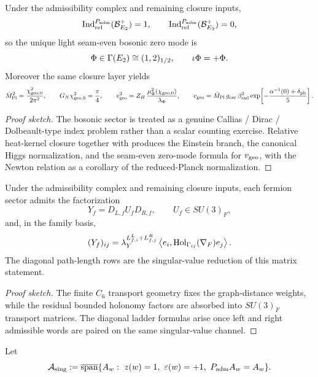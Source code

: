 \begin{theorem}
Under the admissibility complex and remaining closure inputs,
\[
\operatorname{Ind}_{\mathrm{rel}}^{P_{\mathrm{adm}}}(\mathcal B_{E_2}^+)=1,
\qquad
\operatorname{Ind}_{\mathrm{rel}}^{P_{\mathrm{adm}}}(\mathcal B_{E_3}^+)=0,
\]
so the unique light seam-even bosonic zero mode is
\[
\Phi\in\Gamma(E_2)\cong(1,2)_{1/2},
\qquad
\iota\Phi=+\Phi.
\]
Moreover the same closure layer yields
\[
\bar M_{\mathrm{Pl}}^2=\frac{\chi_{\mathrm{geo},0}^2}{2\pi^2},
\qquad
G_N\chi_{\mathrm{geo},0}^2=\frac{\pi}{4},
\qquad
v_{\mathrm{geo}}^2=Z_H\,\frac{\mu_\Phi^2(\chi_{\mathrm{geo},0})}{\lambda_\Phi},
\qquad
v_{\mathrm{geo}}=\bar M_{\mathrm{Pl}}\,g_{\mathrm{car}}\,\beta_{\mathrm{rad}}^2
\exp\!\left[-\frac{\alpha^{-1}(0)+\delta_{\mathrm{ph}}}{5}\right].
\]
\end{theorem}

\begin{proof}[Proof sketch]
The bosonic sector is treated as a genuine Callias / Dirac / Dolbeault-type index problem rather than a scalar counting exercise. Relative heat-kernel closure together with  produces the Einstein branch, the canonical Higgs normalization, and the seam-even zero-mode formula for $v_{\mathrm{geo}}$, with the Newton relation as a corollary of the reduced-Planck normalization.
\end{proof}

\begin{theorem}
Under the admissibility complex and remaining closure inputs, each fermion sector admits the factorization
\[
Y_f=D_{L,f}U_fD_{R,f},
\qquad
U_f\in SU(3)_F,
\]
and, in the family basis,
\[
(Y_f)_{ij}
=
\lambda_Y^{L^L_{f,i}+L^R_{f,j}}
\left\langle e_i,\mathrm{Hol}_{\Gamma_{ij}}(\nabla_F)e_j\right\rangle.
\]
The diagonal path-length rows  are the singular-value reduction of this matrix statement.
\end{theorem}

\begin{proof}[Proof sketch]
The finite $C_6$ transport geometry fixes the graph-distance weights, while the residual bounded holonomy factors are absorbed into $SU(3)_F$ transport matrices. The diagonal ladder formulas arise once left and right admissible words are paired on the same singular-value channel.
\end{proof}

\begin{definition}
Let
\[
\mathcal A_{\mathrm{sing}}
:=
\overline{\mathrm{span}}\{A_w:\ z(w)=1,\ \varepsilon(w)=+1,\ P_{\mathrm{adm}} A_w=A_w\}.
\]
\end{definition}

